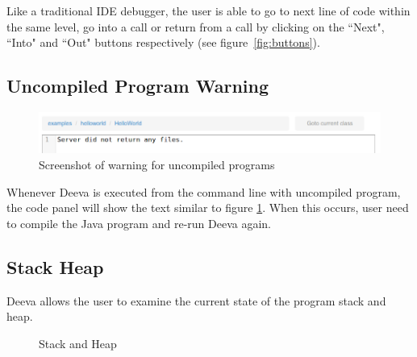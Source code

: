 \documentclass[11pt, a4paper]{article}
\begin{document}
Like a traditional IDE debugger, the user is able to go to next line of code within the same level, go into a call or return from a call by clicking on the ``Next", ``Into" and ``Out" buttons respectively (see figure~\ref{fig:buttons}).

\subsection{Uncompiled Program Warning}
\begin{figure}[h!]
\centering
\includegraphics[scale=0.6]{warningFeature.png}
\caption{Screenshot of warning for uncompiled programs}
\label{fig:warningFeature}
\end{figure}
Whenever Deeva is executed from the command line with uncompiled program, the code panel will show the text similar to figure \ref{fig:warningFeature}. When this occurs, user need to compile the Java program and re-run Deeva again.

\subsection{Stack Heap}
Deeva allows the user to examine the current state of the program stack and heap.
\begin{figure}[h!]
\centering
{}
\quad
{}
\caption{Stack and Heap}
\end{figure}
\end{document}
